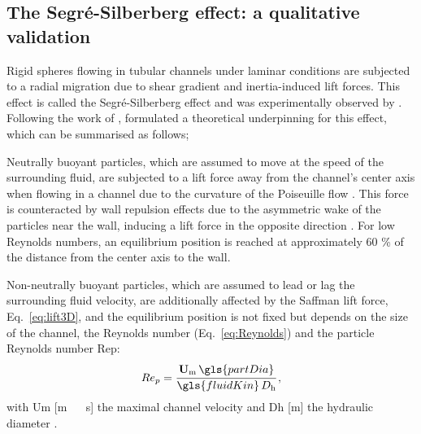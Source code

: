 %

\subsection{The {Segr\'e}-Silberberg effect: a qualitative validation \label{sec:QualVal}}
Rigid spheres flowing in tubular channels under laminar conditions are subjected to a radial migration due to shear gradient and inertia-induced lift forces. This effect is called the Segr\'e-Silberberg effect and was experimentally observed by \cite{Segre1961}. Following the work of \cite{Segre1961}, \cite{Matas2004} formulated a theoretical underpinning for this effect, which can be summarised as follows; \par
Neutrally buoyant particles, which are assumed to move at the speed of the surrounding fluid, are subjected to a lift force away from the channel's center axis when flowing in a channel due to the curvature of the Poiseuille flow . This force is counteracted by wall repulsion effects due to the asymmetric wake of the particles near the wall, inducing a lift force in the opposite direction \citep{Zeng2005}. For low Reynolds numbers, an equilibrium position is reached at approximately 60 \% of the distance from the center axis to the wall.\par
Non-neutrally buoyant particles, which are assumed to lead or lag %
the surrounding fluid velocity, are additionally affected by the Saffman lift force, Eq.\ \eqref{eq:lift3D}, and the equilibrium position is not fixed but depends on the size of the channel, the Reynolds number (Eq.\ \eqref{eq:Reynolds}) and the particle Reynolds number \gls{Rep}:	 
\begin{equation}
 Re_p = \cfrac{\mathbf{U}_\mathrm{m}\, \gls{partDia}}{\gls{fluidKin}\, D_\mathrm{h}} \, ,
 \label{eq:PartRe}
\end{equation}
with \gls{Um} [\unit{\metre\,\reciprocal\second}] the maximal channel velocity and \gls{Dh} [\unit{\metre}] the hydraulic diameter \citep{Segre1961,Matas2004}. \\ \\
